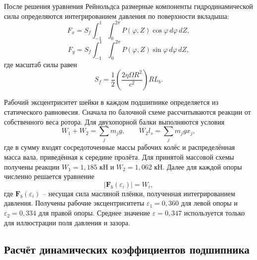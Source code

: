 \documentclass[14pt,a4paper]{extarticle}
\numberwithin{equation}{section}
\numberwithin{figure}{section}
\numberwithin{table}{section}
\begin{document}
После решения уравнения Рейнольдса размерные компоненты гидродинамической силы определяются интегрированием давления по поверхности вкладыша:
\begin{equation}
    F_x=S_f\int_{-1}^{1}\int_{0}^{2\pi}P(\varphi,Z)\cos\varphi\,d\varphi\,dZ,
\end{equation}
\begin{equation}
    F_y=S_f\int_{-1}^{1}\int_{0}^{2\pi}P(\varphi,Z)\sin\varphi\,d\varphi\,dZ,
\end{equation}
где масштаб силы равен
\begin{equation}
    S_f=\frac{1}{2}\left(\frac{2\eta\Omega R^2}{c^2}\right)RL_b.
\end{equation}

Рабочий эксцентриситет шейки в каждом подшипнике определяется из статического равновесия. Сначала по балочной схеме рассчитываются реакции от собственного веса ротора. Для двухопорной балки выполняются условия
\begin{equation}
    W_1+W_2=\sum_j m_jg,\qquad
    W_2 l_s=\sum_j m_jg x_j,
    \label{eq:static_support_reactions}
\end{equation}
где в сумму входят сосредоточенные массы рабочих колёс и распределённая масса вала, приведённая к середине пролёта. Для принятой массовой схемы получены реакции $W_1=1{,}185$ кН и $W_2=1{,}062$ кН. Далее для каждой опоры численно решается уравнение
\begin{equation}
    \left|\mathbf{F}_b(\varepsilon_i)\right|=W_i,
    \label{eq:eccentricity_from_balance}
\end{equation}
где $\mathbf{F}_b(\varepsilon_i)$ -- несущая сила масляной плёнки, полученная интегрированием давления. Получены рабочие эксцентриситеты $\varepsilon_1=0{,}360$ для левой опоры и $\varepsilon_2=0{,}334$ для правой опоры. Среднее значение $\varepsilon=0{,}347$ используется только для иллюстрации поля давления и зазора.

\subsection{Расчёт динамических коэффициентов подшипника}
\end{document}
